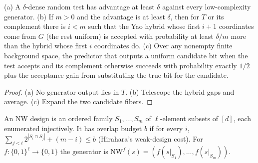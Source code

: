 \begin{lemma}
  \label{lem:avg-test-hybrid}
  \leanok
  (a) A $\delta$-dense random test has advantage at least $\delta$ against every
  low-complexity generator. (b) If $m > 0$ and the advantage is at least
  $\delta$, then for $T$ or its complement there is $i < m$ such that the Yao
  hybrid whose first $i+1$ coordinates come from $G$ (the rest uniform) is
  accepted with probability at least $\delta/m$ more than the hybrid whose
  first $i$ coordinates do. (c) Over any
  nonempty finite background space, the predictor that outputs a uniform
  candidate bit when the test accepts and its complement otherwise succeeds with
  probability exactly $1/2$ plus the acceptance gain from substituting the true
  bit for the candidate.
\end{lemma}
\begin{proof}
  \leanok
  (a) No generator output lies in $T$. (b) Telescope the hybrid gaps and
  average. (c) Expand the two candidate fibers.
\end{proof}

\begin{definition}
  \label{def:avg-nw-design}
  \leanok
  An NW design is an ordered family $S_1, \dots, S_m$ of $\ell$-element subsets
  of $[d]$, each enumerated injectively. It has overlap budget $b$ if for every
  $i$, $\sum_{j<i} 2^{|S_i \cap S_j|} + (m - i) \le b$ (Hirahara's weak-design
  cost). For $f \colon \{0,1\}^\ell \to \{0,1\}$ the generator is
  $\mathrm{NW}^f(s) = (f(s|_{S_1}), \dots, f(s|_{S_m}))$.
\end{definition}

